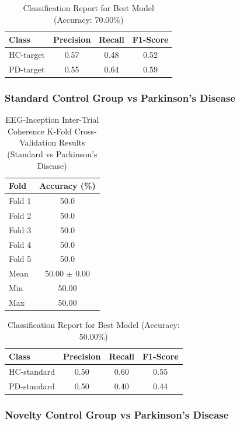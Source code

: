 \documentclass[12pt]{report}
\begin{document}
\begin{table}[h]
\centering
\caption{Classification Report for Best Model (Accuracy: 70.00\%)}
\begin{tabular}{lccc}
\hline
\textbf{Class} & \textbf{Precision} & \textbf{Recall} & \textbf{F1-Score} \\
\hline
HC-target & 0.57 & 0.48 & 0.52 \\
PD-target & 0.55 & 0.64 & 0.59 \\
\hline
\end{tabular}
\end{table}

\subsubsection{Standard Control Group vs Parkinson's Disease}

\begin{table}[h]
\centering
\caption{EEG-Inception Inter-Trial Coherence K-Fold Cross-Validation Results (Standard vs Parkinson's Disease)}
\begin{tabular}{lc}
\hline
\textbf{Fold} & \textbf{Accuracy (\%)} \\
\hline
Fold 1 & 50.0 \\
Fold 2 & 50.0 \\
Fold 3 & 50.0 \\
Fold 4 & 50.0 \\
Fold 5 & 50.0 \\
\hline
Mean & 50.00 $\pm$ 0.00 \\
Min & 50.00 \\
Max & 50.00 \\
\hline
\end{tabular}
\end{table}

\begin{table}[h]
\centering
\caption{Classification Report for Best Model (Accuracy: 50.00\%)}
\begin{tabular}{lccc}
\hline
\textbf{Class} & \textbf{Precision} & \textbf{Recall} & \textbf{F1-Score} \\
\hline
HC-standard & 0.50 & 0.60 & 0.55 \\
PD-standard & 0.50 & 0.40 & 0.44 \\
\hline
\end{tabular}
\end{table}

\subsubsection{Novelty Control Group vs Parkinson's Disease}
\end{document}
